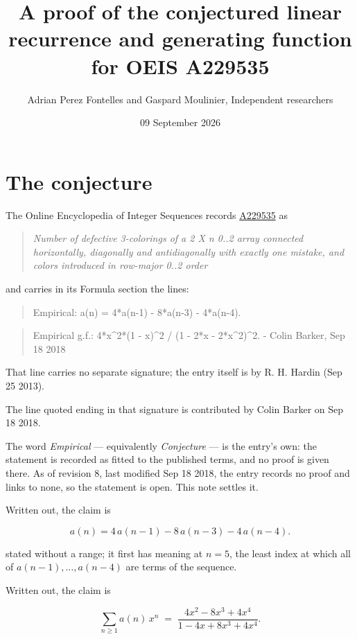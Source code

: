 \documentclass[11pt]{article}
\title{A proof of the conjectured linear recurrence and generating function for OEIS A229535}
\author{Adrian Perez Fontelles and Gaspard Moulinier, Independent researchers}
\date{09 September 2026}
\theoremstyle{definition}
\begin{document}
\maketitle
\section{The conjecture}

The Online Encyclopedia of Integer Sequences records \href{https://oeis.org/A229535}{A229535} as

\begin{quote}\itshape Number of defective 3-colorings of a 2 X n 0..2 array connected horizontally, diagonally and antidiagonally with exactly one mistake, and colors introduced in row-major 0..2 order\end{quote}

and carries in its Formula section the lines:

\begin{quote}\ttfamily Empirical: a(n) = 4*a(n-1) - 8*a(n-3) - 4*a(n-4).\end{quote}

\begin{quote}\ttfamily Empirical g.f.: 4*x\textasciicircum{}2*(1 - x)\textasciicircum{}2 / (1 - 2*x - 2*x\textasciicircum{}2)\textasciicircum{}2. - Colin Barker, Sep 18 2018\end{quote}

That line carries no separate signature; the entry itself is by R. H. Hardin (Sep 25 2013).

The line quoted ending in that signature is contributed by Colin Barker on Sep 18 2018.

The word {\itshape Empirical} --- equivalently {\itshape Conjecture} --- is the entry's own: the statement is recorded as fitted to the published terms, and no proof is given there. As of revision 8, last modified Sep 18 2018, the entry records no proof and links to none, so the statement is open. This note settles it.

Written out, the claim is

\[a(n) = 4\,a(n-1) - 8\,a(n-3) - 4\,a(n-4).\]

stated without a range; it first has meaning at $n = 5$, the least index at which all of $a(n-1),\dots,a(n-4)$ are terms of the sequence.

Written out, the claim is

\[\sum_{n \ge 1} a(n)\,x^n \;=\; \frac{4x^{2} - 8x^{3} + 4x^{4}}{1 - 4x + 8x^{3} + 4x^{4}}.\]
\end{document}
